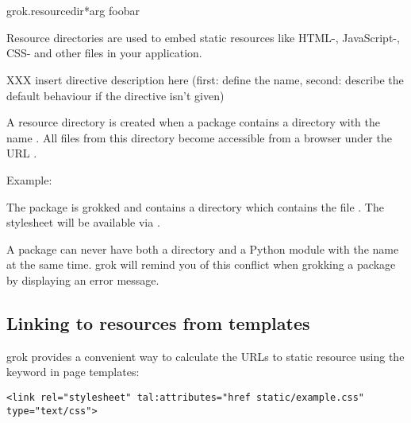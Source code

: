     \section{}

        \begin{funcdesc}{grok.resourcedir}{*arg}
        foobar
        \end{funcdesc}

        Resource directories are used to embed static resources like HTML-,
        JavaScript-, CSS- and other files in your application.

        XXX insert directive description here (first: define the name, second:
        describe the default behaviour if the directive isn't given)

        A resource directory is created when a package contains a directory
        with the name . All files from this directory become
        accessible from a browser under the URL
        .

        \begin{bf}Example:\end{bf} The package  is grokked and
        contains a directory  which contains the file
        . The stylesheet will be available via
        .

        \begin{notice}
        A package can never have both a  directory and a Python
        module with the name  at the same time. grok will
        remind you of this conflict when grokking a package by displaying an
        error message.
        \end{notice}

        \subsection{Linking to resources from templates}

            grok provides a convenient way to calculate the URLs to static
            resource using the keyword  in page templates:

            \begin{verbatim}
<link rel="stylesheet" tal:attributes="href static/example.css" type="text/css">
            \end{verbatim}

